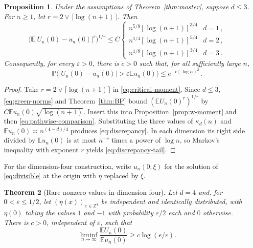\documentclass[11pt]{amsart}
\theoremstyle{plain}
\newtheorem{theorem}{Theorem}[section]
\newtheorem{proposition}[theorem]{Proposition}
\theoremstyle{definition}
\newcommand{\Z}{\mathbb{Z}}
\newcommand{\E}{\mathbb{E}}
\renewcommand{\P}{\mathbb{P}}
\newcommand{\eps}{\varepsilon}
\begin{document}
\begin{proposition}\label{prop:discrepancy}
	Under the assumptions of Theorem~\ref{thm:master}, suppose $d\leq3$. For
	$n\geq1$, let $r=2\vee\lceil\log(n+1)\rceil$. Then
	\begin{equation}\label{eq:discrepancy}
		\bigl(\E|U_n(0)-u_n(0)|^r\bigr)^{1/r}\leq C
		\begin{cases}
			n^{5/8}[\log(n+1)]^{3/4}&d=1\,,\\
			n^{1/4}[\log(n+1)]^{5/4}&d=2\,,\\
			n^{1/8}[\log(n+1)]^{3/4}&d=3\,.
		\end{cases}
	\end{equation}
	Consequently, for every $\eps>0$, there is $c>0$ such that, for all
	sufficiently large $n$,
	\begin{equation}\label{eq:discrepancy-tail}
		\P\bigl(|U_n(0)-u_n(0)|>\eps\E u_n(0)\bigr)
		\leq e^{-c(\log n)^2}\,.
	\end{equation}
\end{proposition}

\begin{proof}
	Take $r=2\vee\lceil\log(n+1)\rceil$ in
	\eqref{eq:critical-moment}. Since $d\leq3$, \eqref{eq:green-norms} and
	Theorem~\ref{thm:BP} bound $(\E U_n(0)^r)^{1/r}$ by
	$C\E u_n(0)\sqrt{\log(n+1)}$. Insert this into
	Proposition~\ref{prop:w-moment} and then
	\eqref{eq:pathwise-comparison}. Substituting the three values of
	$\kappa_d(n)$ and $\E u_n(0)\asymp n^{(4-d)/4}$ produces
	\eqref{eq:discrepancy}. In each dimension its right side divided by
	$\E u_n(0)$ is at most $n^{-c}$ times a power of $\log n$, so Markov's
	inequality with exponent $r$ yields \eqref{eq:discrepancy-tail}.
\end{proof}

For the dimension-four construction, write $u_n(0;\xi)$ for the solution of
\eqref{eq:divisible} at the origin with $\eta$ replaced by $\xi$.

\begin{theorem}[Rare nonzero values in dimension four]\label{thm:four-sparse}
	Let $d=4$ and, for $0<\eps\leq1/2$, let $(\eta(x))_{x\in\Z^4}$ be independent
	and identically distributed, with $\eta(0)$ taking the values $1$ and
	$-1$ with probability $\eps/2$ each and $0$ otherwise. There is
	$c>0$, independent of $\eps$, such that
	\begin{equation}\label{eq:four-sparse}
		\liminf_{n\to\infty}\frac{\E U_n(0)}{\E u_n(0)}
		\geq c\log(e/\eps).
	\end{equation}
\end{theorem}
\end{document}
